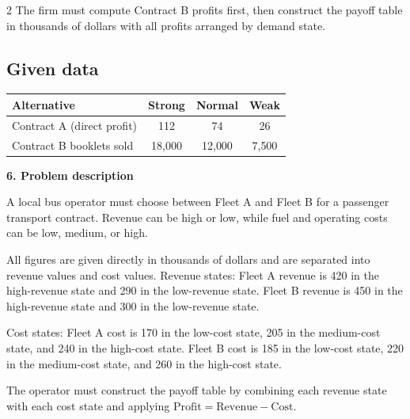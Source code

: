 \documentclass[12pt]{article}
\newcommand{\SubsectionBox}[1]{%
	\noindent\colorbox{gray!30}{%
		\parbox{\linewidth}{\textbf{#1}}%
	}\par\vspace{0.35cm}%
}
\begin{document}
\begin{multicols}{2}
				The firm must compute Contract B profits first, then construct the payoff table in thousands of dollars with all profits arranged by demand state.
				\subsection*{Given data}
				\begin{center}
					\begin{tabular}{l c c c}
						\toprule
						Alternative & Strong & Normal & Weak \\
						\midrule
						Contract A (direct profit) & 112 & 74 & 26 \\
						Contract B booklets sold & 18{,}000 & 12{,}000 & 7{,}500 \\
						\bottomrule
					\end{tabular}
				\end{center}

		\vspace{0.25cm}
		\SubsectionBox{6. Problem description}\vspace{-0.25cm}
		A local bus operator must choose between Fleet A and Fleet B for a passenger transport contract.
				Revenue can be high or low, while fuel and operating costs can be low, medium, or high.
				
				All figures are given directly in thousands of dollars and are separated into revenue values and cost values.
				Revenue states:
				Fleet A revenue is 420 in the high-revenue state and 290 in the low-revenue state.
				Fleet B revenue is 450 in the high-revenue state and 300 in the low-revenue state.
				
				Cost states:
				Fleet A cost is 170 in the low-cost state, 205 in the medium-cost state, and 240 in the high-cost state.
				Fleet B cost is 185 in the low-cost state, 220 in the medium-cost state, and 260 in the high-cost state.
				
				The operator must construct the payoff table by combining each revenue state with each cost state and applying
				\(\text{Profit}=\text{Revenue}-\text{Cost}\).

\end{multicols}
\end{document}
